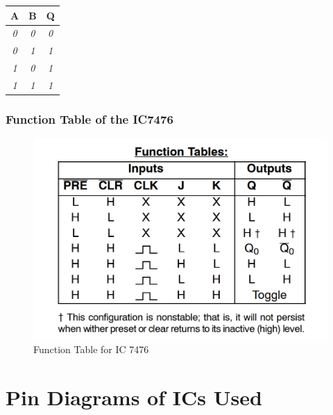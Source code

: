 \documentclass[11pt]{article}
\begin{document}
\begin{table}[H]
	\begin{tabular}{|c|c|c|}
		\hline
		{\color[HTML]{000000} \textbf{A}} & {\color[HTML]{000000} \textbf{B}} & {\color[HTML]{000000} \textbf{Q}} \\ \hline
		{\color[HTML]{330001} \textit{0}} & {\color[HTML]{330001} \textit{0}} & {\color[HTML]{F56B00} \textit{0}} \\ \hline
		{\color[HTML]{330001} \textit{0}} & {\color[HTML]{330001} \textit{1}} & {\color[HTML]{F56B00} \textit{1}} \\ \hline
		{\color[HTML]{330001} \textit{1}} & {\color[HTML]{330001} \textit{0}} & {\color[HTML]{F56B00} \textit{1}} \\ \hline
		{\color[HTML]{330001} \textit{1}} & {\color[HTML]{330001} \textit{1}} & {\color[HTML]{F56B00} \textit{1}} \\ \hline
	\end{tabular}
\end{table}

\subsubsection{Function Table of the IC7476}
\begin{figure}[H]
	\centering
	\includegraphics[scale = 0.5]{7476 function table.png}
	\caption{Function Table for IC 7476}
\end{figure}

\section{Pin Diagrams of ICs Used}
\end{document}
